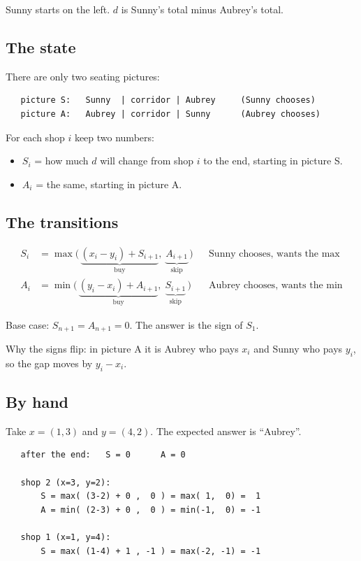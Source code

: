 \documentclass[11pt]{article}
\begin{document}
Sunny starts on the left. $d$ is Sunny's total minus Aubrey's total.

\subsection*{The state}

There are only two seating pictures:

\begin{verbatim}
   picture S:   Sunny  | corridor | Aubrey     (Sunny chooses)
   picture A:   Aubrey | corridor | Sunny      (Aubrey chooses)
\end{verbatim}

For each shop $i$ keep two numbers:

\begin{itemize}
  \item $S_i$ = how much $d$ will change from shop $i$ to the end, starting in picture S.
  \item $A_i$ = the same, starting in picture A.
\end{itemize}

\subsection*{The transitions}

\begin{align*}
  S_i &= \max\bigl(\,\underbrace{(x_i - y_i) + S_{i+1}}_{\text{buy}},\;
                   \underbrace{A_{i+1}}_{\text{skip}}\,\bigr)
  &&\text{Sunny chooses, wants the max}\\[4pt]
  A_i &= \min\bigl(\,\underbrace{(y_i - x_i) + A_{i+1}}_{\text{buy}},\;
                   \underbrace{S_{i+1}}_{\text{skip}}\,\bigr)
  &&\text{Aubrey chooses, wants the min}
\end{align*}

Base case: $S_{n+1} = A_{n+1} = 0$. The answer is the sign of $S_1$.

Why the signs flip: in picture A it is Aubrey who pays $x_i$ and Sunny who pays
$y_i$, so the gap moves by $y_i - x_i$.

\subsection*{By hand}

Take $x = (1, 3)$ and $y = (4, 2)$. The expected answer is ``Aubrey''.

\begin{verbatim}
   after the end:   S = 0      A = 0

   shop 2 (x=3, y=2):
       S = max( (3-2) + 0 ,  0 ) = max( 1,  0) =  1
       A = min( (2-3) + 0 ,  0 ) = min(-1,  0) = -1

   shop 1 (x=1, y=4):
       S = max( (1-4) + 1 , -1 ) = max(-2, -1) = -1
\end{verbatim}
\end{document}
